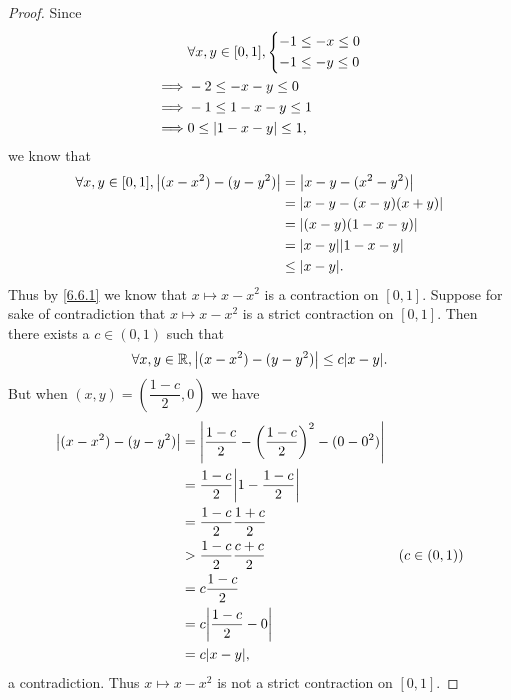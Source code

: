 \begin{proof}
  Since
  \begin{align*}
             & \forall x, y \in [0, 1], \begin{dcases}
                                          -1 \leq -x \leq 0 \\
                                          -1 \leq -y \leq 0
                                        \end{dcases} \\
    \implies & -2 \leq -x - y \leq 0                      \\
    \implies & -1 \leq 1 - x - y \leq 1                   \\
    \implies & 0 \leq \left\lvert1 - x - y\right\rvert \leq 1,
  \end{align*}
  we know that
  \begin{align*}
    \forall x, y \in [0, 1], \abs{(x - x^2) - (y - y^2)} & = \abs{x - y - (x^2 - y^2)}    \\
                                                         & = \abs{x - y - (x - y)(x + y)} \\
                                                         & = \abs{(x - y)(1 - x - y)}     \\
                                                         & = \abs{x - y} \abs{1 - x - y}  \\
                                                         & \leq \abs{x - y}.
  \end{align*}
  Thus by \cref{6.6.1} we know that \(x \mapsto x - x^2\) is a contraction on \([0, 1]\).
  Suppose for sake of contradiction that \(x \mapsto x - x^2\) is a strict contraction on \([0, 1]\).
  Then there exists a \(c \in (0, 1)\) such that
  \[
    \forall x, y \in \R, \abs{(x - x^2) - (y - y^2)} \leq c \abs{x - y}.
  \]
  But when \((x, y) = (\dfrac{1 - c}{2}, 0)\) we have
  \begin{align*}
    \abs{(x - x^2) - (y - y^2)} & = \abs{\dfrac{1 - c}{2} - \bigg(\dfrac{1 - c}{2}\bigg)^2 - (0 - 0^2)}                  \\
                                & = \dfrac{1 - c}{2} \abs{1 - \dfrac{1 - c}{2}}                                          \\
                                & = \dfrac{1 - c}{2} \dfrac{1 + c}{2}                                                    \\
                                & > \dfrac{1 - c}{2} \dfrac{c + c}{2}                                   & (c \in (0, 1)) \\
                                & = c \dfrac{1 - c}{2}                                                                   \\
                                & = c \abs{\dfrac{1 - c}{2} - 0}                                                         \\
                                & = c \abs{x - y},
  \end{align*}
  a contradiction.
  Thus \(x \mapsto x - x^2\) is not a strict contraction on \([0, 1]\).
\end{proof}

